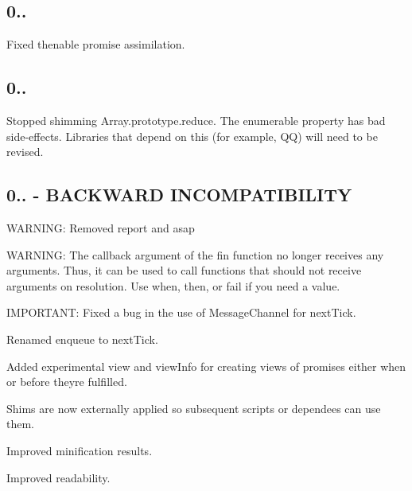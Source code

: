 \subsection*{0..}


\begin{DoxyItemize}
\item Fixed thenable promise assimilation.
\end{DoxyItemize}

\subsection*{0..}


\begin{DoxyItemize}
\item Stopped shimming {\ttfamily Array.\+prototype.\+reduce}. The enumerable property has bad side-\/effects. Libraries that depend on this (for example, QQ) will need to be revised.
\end{DoxyItemize}

\subsection*{0.. -\/ B\+A\+C\+K\+W\+A\+RD I\+N\+C\+O\+M\+P\+A\+T\+I\+B\+I\+L\+I\+TY}


\begin{DoxyItemize}
\item W\+A\+R\+N\+I\+NG\+: Removed {\ttfamily report} and {\ttfamily asap}
\item W\+A\+R\+N\+I\+NG\+: The {\ttfamily callback} argument of the {\ttfamily fin} function no longer receives any arguments. Thus, it can be used to call functions that should not receive arguments on resolution. Use {\ttfamily when}, {\ttfamily then}, or {\ttfamily fail} if you need a value.
\item I\+M\+P\+O\+R\+T\+A\+NT\+: Fixed a bug in the use of {\ttfamily Message\+Channel} for {\ttfamily next\+Tick}.
\item Renamed {\ttfamily enqueue} to {\ttfamily next\+Tick}.
\item Added experimental {\ttfamily view} and {\ttfamily view\+Info} for creating views of promises either when or before they\textquotesingle{}re fulfilled.
\item Shims are now externally applied so subsequent scripts or dependees can use them.
\item Improved minification results.
\item Improved readability.
\end{DoxyItemize}

